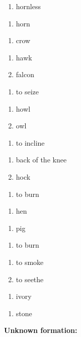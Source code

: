 \begin{enumerate}
\item hornless
\end{enumerate}
\begin{enumerate}
\item horn
\end{enumerate}
\begin{enumerate}
\item crow
\end{enumerate}
\begin{enumerate}
\item hawk
\item falcon
\end{enumerate}
\begin{enumerate}
\item to seize
\end{enumerate}
\begin{enumerate}
\item howl
\item owl
\end{enumerate}
\begin{enumerate}
\item to incline
\end{enumerate}
\begin{enumerate}
\item back of the knee
\item hock
\end{enumerate}
\begin{enumerate}
\item to burn
\end{enumerate}
\begin{enumerate}
\item hen
\end{enumerate}
\begin{enumerate}
\item pig
\end{enumerate}
\begin{enumerate}
\item to burn
\end{enumerate}
\begin{enumerate}
\item to smoke
\item to seethe
\end{enumerate}
\begin{enumerate}
\item ivory
\end{enumerate}
\begin{enumerate}
\item stone
\end{enumerate}
\noindent\textbf{Unknown formation:}\\

